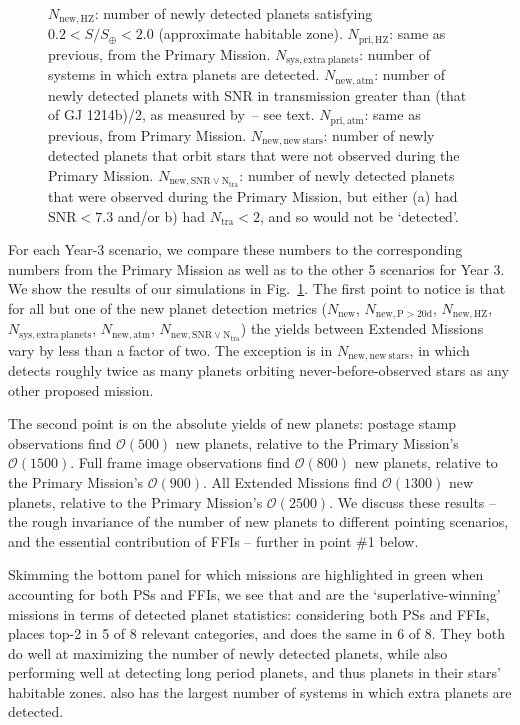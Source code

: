 \begin{figure}[!t]
{	$N_\mathrm{new,HZ}$: number of newly detected planets satisfying $0.2<S/S_\oplus<2.0$ (approximate habitable zone).
	$N_\mathrm{pri,HZ}$: same as previous, from the Primary Mission.
	$N_\mathrm{sys,extra\ planets}$: number of systems in which extra planets are detected.
	$N_\mathrm{new,atm}$: number of newly detected planets with SNR in transmission greater than (that of GJ 1214b)/2, as measured by \jwst\,-- see text.
	$N_\mathrm{pri,atm}$: same as previous, from Primary Mission.
	$N_\mathrm{new,new\ stars}$: number of newly detected planets that orbit 
	stars that were not observed during the Primary Mission.
	$N_\mathrm{new,SNR\lor N_{tra}}$: number of newly detected planets that were 
	observed during the Primary Mission, but either (a) had 
	$\mathrm{SNR}<7.3$ and/or b) had $N_\mathrm{tra}<2$, and so would not be 
	`detected'.}
	\label{fig:yield_results}
\end{figure}

For each Year-3 scenario, we compare these numbers to the
corresponding numbers from the Primary Mission as well as to the other
5 scenarios for Year 3. We show the results of our simulations in
Fig.~\ref{fig:yield_results}.  The first point to notice is that for
all but one of the new planet detection metrics ($N_\mathrm{new}$,
$N_\mathrm{new,P>20d}$, $N_\mathrm{new,HZ}$,
$N_\mathrm{sys,extra\ planets}$, $N_\mathrm{new,atm}$,
$N_\mathrm{new,SNR\lor N_{tra}}$) the yields between Extended Missions
vary by less than a factor of two.  The exception is in
$N_\mathrm{new,new\ stars}$, in which \elong\:detects roughly twice as
many planets orbiting never-before-observed stars as any other
proposed mission.

The second point is on the absolute yields of new planets: postage stamp observations find $\mathcal{O}(500)$ new planets, relative to the Primary Mission's $\mathcal{O}(1500)$.
Full frame image observations find $\mathcal{O}(800)$ new planets, relative to the Primary Mission's $\mathcal{O}(900)$.
All Extended Missions find $\mathcal{O}(1300)$ new planets, relative to the Primary Mission's $\mathcal{O}(2500)$.
We discuss these results -- the rough invariance of the number of new planets to different pointing scenarios, and the essential contribution of FFIs -- further in point \#1 below.

Skimming the bottom panel for which missions are highlighted in green when accounting for both PSs and FFIs, we see that \npole\:and \hemis\:are the `superlative-winning' missions in terms of detected planet statistics: considering both PSs and FFIs, \npole\:places top-2 in 5 of 8 relevant categories, and \hemis\:does the same in 6 of 8.
They both do well at maximizing the number of newly detected planets, while also performing well at detecting long period planets, and thus planets in their stars' habitable zones.
\hemis\:also has the largest number of systems in which extra planets are detected.

